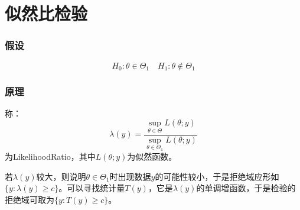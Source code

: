 \section{似然比检验}


\subsubsection{假设}
\begin{equation*}
	H_0:\theta\in\Theta_1\quad H_1:\theta\notin\Theta_1
\end{equation*}
\subsubsection{原理}
\begin{definition}
	称：
	\begin{equation*}
		\lambda(y)=\frac{\sup\limits_{\theta\in\Theta}L(\theta;y)}{\sup\limits_{\theta\in\Theta_1}L(\theta;y)}
	\end{equation*}
	为\gls{LikelihoodRatio}，其中$L(\theta;y)$为似然函数\label{method:LikelihoodTest}。
\end{definition}
\begin{derivation}
	若$\lambda(y)$较大，则说明$\theta\in\Theta_1$时出现数据$y$的可能性较小，于是拒绝域应形如$\{y:\lambda(y)\geqslant c\}$。可以寻找统计量$T(y)$，它是$\lambda(y)$的单调增函数，于是检验的拒绝域可取为$\{y:T(y)\geqslant c\}$。
\end{derivation}
